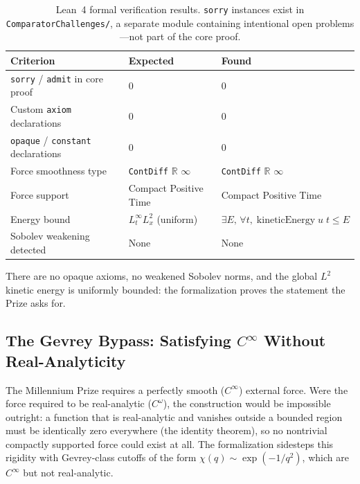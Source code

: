 \documentclass[11pt,a4paper]{article}
\begin{document}
\begin{table}[ht]
\centering
\small
\begin{tabular}{@{}p{4.0cm}p{4.0cm}p{6.5cm}@{}}
\toprule
\textbf{Criterion} & \textbf{Expected} & \textbf{Found} \\
\midrule
\texttt{sorry} / \texttt{admit} in core proof & 0 & 0 \\
Custom \texttt{axiom} declarations & 0 & 0 \\
\texttt{opaque} / \texttt{constant} declarations & 0 & 0 \\
Force smoothness type & \texttt{ContDiff} $\mathbb{R}$ $\infty$ & \texttt{ContDiff} $\mathbb{R}$ $\infty$ \\
Force support & Compact Positive Time & Compact Positive Time \\
Energy bound & $L^\infty_t L^2_x$ (uniform) & $\exists E,\, \forall t,\; \text{kineticEnergy}\; u\; t \leq E$ \\
Sobolev weakening detected & None & None \\
\bottomrule
\end{tabular}
\caption{Lean~4 formal verification results. \texttt{sorry} instances exist in
\texttt{ComparatorChallenges/}, a separate module containing intentional open problems---not part
of the core proof.}
\label{tab:lean-verification}
\end{table}

There are no opaque axioms, no weakened Sobolev norms, and the global $L^2$ kinetic energy is
uniformly bounded: the formalization proves the statement the Prize asks for.

\subsection{\texorpdfstring{The Gevrey Bypass: Satisfying $C^\infty$ Without Real-Analyticity}{The Gevrey Bypass: Satisfying C-infinity Without Real-Analyticity}}

The Millennium Prize requires a perfectly smooth ($C^\infty$) external force. Were the force required
to be real-analytic ($C^\omega$), the construction would be impossible outright: a function that is
real-analytic and vanishes outside a bounded region must be identically zero everywhere (the identity
theorem), so no nontrivial compactly supported force could exist at all. The formalization sidesteps
this rigidity with Gevrey-class cutoffs of the form $\chi(q) \sim \exp(-1/q^2)$, which are
$C^\infty$ but not real-analytic.
\end{document}
